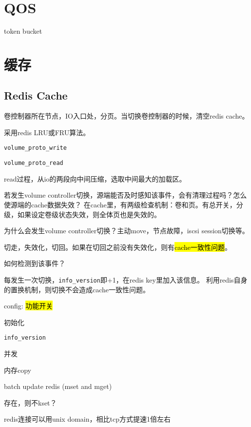 \section{QOS}

token bucket



\section{缓存}

\subsection{Redis Cache}

卷控制器所在节点，IO入口处，分页。当切换卷控制器的时候，清空redis cache。

采用redis LRU或FRU算法。

\begin{compactitem}
    \item \verb|volume_proto_write|
    \item \verb|volume_proto_read|
\end{compactitem}

read过程，从io的两段向中间压缩，选取中间最大的加载区。

若发生volume controller切换，源端能否及时感知该事件，会有清理过程吗？怎么使源端的cache数据失效？
在cache里，有两级检查机制：卷和页。有总开关，分级，如果设定卷级状态失效，则全体页也是失效的。

为什么会发生volume controller切换？主动move，节点故障，iscsi session切换等。

切走，失效化，切回。如果在切回之前没有失效化，则有\hl{cache一致性问题}。

如何检测到该事件？

\begin{tcolorbox}
每发生一次切换，\verb|info_version|即+1，在redis key里加入该信息。
利用redis自身的置换机制，则切换不会造成cache一致性问题。
\end{tcolorbox}

\begin{compactenum}
\item config: \hl{功能开关}
\item 初始化
\item \verb|info_version|
\item 并发
\item 内存copy
\item batch update redis (mset and mget)
\item 存在，则不kset？
\item redis连接可以用unix domain，相比tcp方式提速1倍左右
\end{compactenum}

